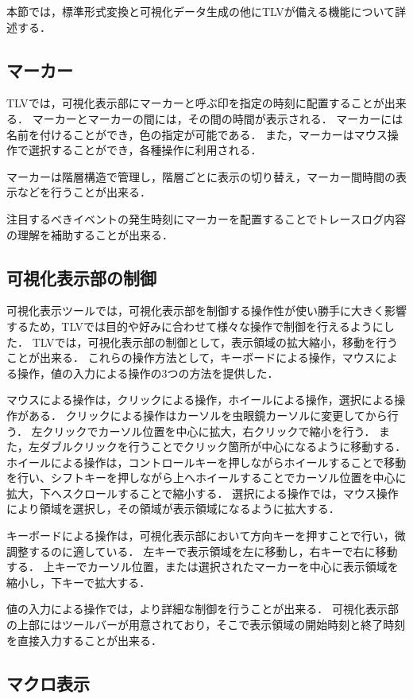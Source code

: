 本節では，標準形式変換と可視化データ生成の他にTLVが備える機能について詳述する．

\subsection{マーカー}
TLVでは，可視化表示部にマーカーと呼ぶ印を指定の時刻に配置することが出来る．
マーカーとマーカーの間には，その間の時間が表示される．
マーカーには名前を付けることができ，色の指定が可能である．
また，マーカーはマウス操作で選択することができ，各種操作に利用される．

マーカーは階層構造で管理し，階層ごとに表示の切り替え，マーカー間時間の表示などを行うことが出来る．

注目するべきイベントの発生時刻にマーカーを配置することでトレースログ内容の理解を補助することが出来る．

\subsection{可視化表示部の制御}

可視化表示ツールでは，可視化表示部を制御する操作性が使い勝手に大きく影響するため，TLVでは目的や好みに合わせて様々な操作で制御を行えるようにした．
TLVでは，可視化表示部の制御として，表示領域の拡大縮小，移動を行うことが出来る．
これらの操作方法として，キーボードによる操作，マウスによる操作，値の入力による操作の3つの方法を提供した．

マウスによる操作は，クリックによる操作，ホイールによる操作，選択による操作がある．
クリックによる操作はカーソルを虫眼鏡カーソルに変更してから行う．
左クリックでカーソル位置を中心に拡大，右クリックで縮小を行う．
また，左ダブルクリックを行うことでクリック箇所が中心になるように移動する．
ホイールによる操作は，コントロールキーを押しながらホイールすることで移動を行い、シフトキーを押しながら上へホイールすることでカーソル位置を中心に拡大，下へスクロールすることで縮小する．
選択による操作では，マウス操作により領域を選択し，その領域が表示領域になるように拡大する．

キーボードによる操作は，可視化表示部において方向キーを押すことで行い，微調整するのに適している．
左キーで表示領域を左に移動し，右キーで右に移動する．
上キーでカーソル位置，または選択されたマーカーを中心に表示領域を縮小し，下キーで拡大する．

値の入力による操作では，より詳細な制御を行うことが出来る．
可視化表示部の上部にはツールバーが用意されており，そこで表示領域の開始時刻と終了時刻を直接入力することが出来る．

\subsection{マクロ表示}

